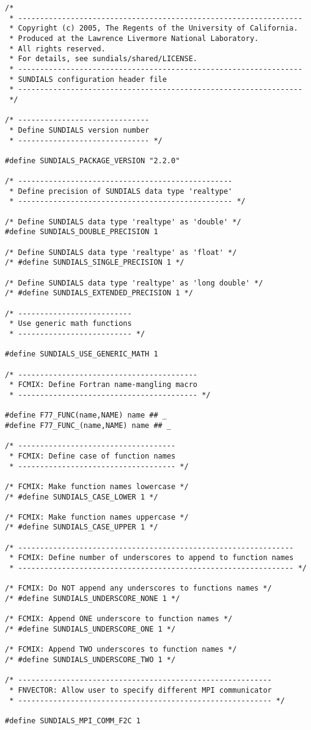 \begin{verbatim}
/*
 * -----------------------------------------------------------------
 * Copyright (c) 2005, The Regents of the University of California.
 * Produced at the Lawrence Livermore National Laboratory.
 * All rights reserved.
 * For details, see sundials/shared/LICENSE.
 * -----------------------------------------------------------------
 * SUNDIALS configuration header file
 * -----------------------------------------------------------------
 */
 
/* ------------------------------  
 * Define SUNDIALS version number
 * ------------------------------ */

#define SUNDIALS_PACKAGE_VERSION "2.2.0"
 
/* ------------------------------------------------- 
 * Define precision of SUNDIALS data type 'realtype'
 * ------------------------------------------------- */

/* Define SUNDIALS data type 'realtype' as 'double' */
#define SUNDIALS_DOUBLE_PRECISION 1

/* Define SUNDIALS data type 'realtype' as 'float' */
/* #define SUNDIALS_SINGLE_PRECISION 1 */

/* Define SUNDIALS data type 'realtype' as 'long double' */
/* #define SUNDIALS_EXTENDED_PRECISION 1 */

/* --------------------------
 * Use generic math functions
 * -------------------------- */

#define SUNDIALS_USE_GENERIC_MATH 1
  
/* -----------------------------------------
 * FCMIX: Define Fortran name-mangling macro
 * ----------------------------------------- */

#define F77_FUNC(name,NAME) name ## _
#define F77_FUNC_(name,NAME) name ## _

/* ------------------------------------
 * FCMIX: Define case of function names
 * ------------------------------------ */
 
/* FCMIX: Make function names lowercase */
/* #define SUNDIALS_CASE_LOWER 1 */

/* FCMIX: Make function names uppercase */
/* #define SUNDIALS_CASE_UPPER 1 */

/* ---------------------------------------------------------------
 * FCMIX: Define number of underscores to append to function names
 * --------------------------------------------------------------- */

/* FCMIX: Do NOT append any underscores to functions names */
/* #define SUNDIALS_UNDERSCORE_NONE 1 */

/* FCMIX: Append ONE underscore to function names */
/* #define SUNDIALS_UNDERSCORE_ONE 1 */

/* FCMIX: Append TWO underscores to function names */
/* #define SUNDIALS_UNDERSCORE_TWO 1 */
 
/* ----------------------------------------------------------
 * FNVECTOR: Allow user to specify different MPI communicator
 * ---------------------------------------------------------- */

#define SUNDIALS_MPI_COMM_F2C 1

\end{verbatim}
